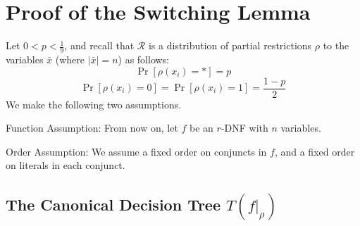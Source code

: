 % 
% 
% 
% 
% 
% 
% 
% 
% 
% 
% 
% 
% 
% 
% 
% 
 


\section{Proof of the Switching Lemma}

Let \( 0 < p < \frac{1}{9} \), and recall that  \(\mathcal{R}\) is a distribution of partial restrictions
\(\rho\) to the variables \( \bar{x} \) (where \( |\bar{x}| = n \)) as follows:
\[
\Pr[\rho(x_i) = *] = p
\]
\[
\Pr[\rho(x_i) = 0] = \Pr[\rho(x_i) = 1] = \frac{1 - p}{2}
\]
We make the following two assumptions.

Function Assumption: From now on, let \( f \) be an $r$-DNF with \( n \) variables.

Order Assumption:  We assume a fixed order on conjuncts in \( f \),
and a fixed order on literals in each conjunct.

\subsection{The Canonical Decision Tree \( T(f|_{\rho}) \)}

